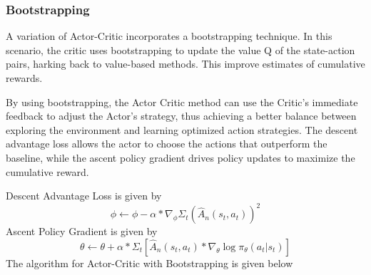 \documentclass{article}
\begin{document}
\subsubsection{Bootstrapping}
\par A variation of Actor-Critic incorporates a bootstrapping technique. In this scenario, the critic uses bootstrapping to update the value Q of the state-action pairs, harking back to value-based methods. This improve estimates of cumulative rewards. 
\par By using bootstrapping, the Actor Critic method can use the Critic's immediate feedback to adjust the Actor's strategy, thus achieving a better balance between exploring the environment and learning optimized action strategies.
The descent advantage loss allows the actor to choose the actions that outperform the baseline, while the ascent policy gradient drives policy updates to maximize the cumulative reward.
\par Descent Advantage Loss is given by
\begin{equation*}
\phi \leftarrow \phi - \alpha * \nabla_\phi\Sigma_t(\hat{A}_n(s_t,a_t))^2
\end{equation*}
Ascent Policy Gradient is given by
\begin{equation*}
\theta \leftarrow \theta + \alpha * \Sigma_t[\hat{A}_n(s_t,a_t)*\nabla_\theta\log\pi_\theta(a_t|s_t)]
\end{equation*}
The algorithm for Actor-Critic with Bootstrapping is given below \cite{plaat-deeprl}
\end{document}
